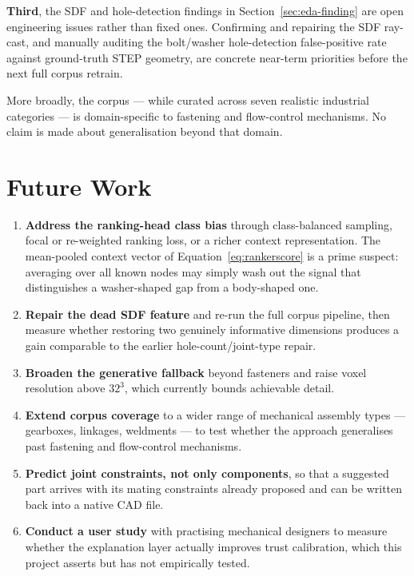\documentclass[12pt,oneside,a4paper]{report}
\begin{document}
\textbf{Third}, the SDF and hole-detection findings in
Section~\ref{sec:eda-finding} are open engineering issues rather than fixed
ones. Confirming and repairing the SDF ray-cast, and manually auditing the
bolt/washer hole-detection false-positive rate against ground-truth STEP
geometry, are concrete near-term priorities before the next full corpus
retrain.

More broadly, the corpus --- while curated across seven realistic industrial
categories --- is domain-specific to fastening and flow-control mechanisms.
No claim is made about generalisation beyond that domain.

\section{Future Work}

\begin{enumerate}[leftmargin=2.0cm]
\item \textbf{Address the ranking-head class bias} through class-balanced
sampling, focal or re-weighted ranking loss, or a richer context
representation. The mean-pooled context vector of
Equation~\ref{eq:rankerscore} is a prime suspect: averaging over all known
nodes may simply wash out the signal that distinguishes a washer-shaped gap
from a body-shaped one.
\item \textbf{Repair the dead SDF feature} and re-run the full corpus
pipeline, then measure whether restoring two genuinely informative dimensions
produces a gain comparable to the earlier hole-count/joint-type repair.
\item \textbf{Broaden the generative fallback} beyond fasteners and raise
voxel resolution above $32^3$, which currently bounds achievable detail.
\item \textbf{Extend corpus coverage} to a wider range of mechanical assembly
types --- gearboxes, linkages, weldments --- to test whether the approach
generalises past fastening and flow-control mechanisms.
\item \textbf{Predict joint constraints, not only components}, so that a
suggested part arrives with its mating constraints already proposed and can
be written back into a native CAD file.
\item \textbf{Conduct a user study} with practising mechanical designers to
measure whether the explanation layer actually improves trust calibration,
which this project asserts but has not empirically tested.
\end{enumerate}
\end{document}
